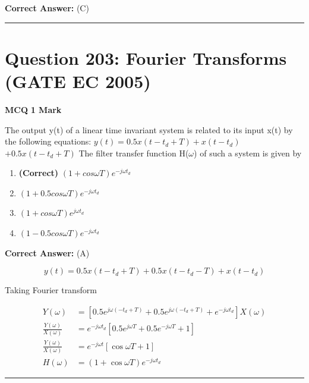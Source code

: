 \documentclass[11pt,a4paper]{article}
\begin{document}
\noindent \textbf{Correct Answer:} (C)


\vspace{1.5em}
\hrule
\vspace{1.5em}

\section*{Question 203: Fourier Transforms (GATE EC 2005)}
\noindent \textbf{\color{primary}MCQ} \hfill \textbf{\color{secondary}1 Mark}


\noindent The output y(t) of a linear time invariant system is related to its input x(t) by
the following equations:
 $y(t)=0.5x(t-t_{d}+T)+x(t-t_{d})$ $+0.5x(t-t_{d}+T)$
The filter transfer function H($\omega$) of such a system is given by


\begin{enumerate}[label=(\Alph*)]
    \item \textbf{(Correct)} $(1+cos\omega T)e^{-j\omega t_{d}}$
    \item $(1+0.5cos\omega T)e^{-j\omega t_{d}}$
    \item $(1+cos\omega T)e^{j\omega t_{d}}$
    \item $(1-0.5cos\omega T)e^{-j\omega t_{d}}$
\end{enumerate}

\noindent \textbf{Correct Answer:} (A)

\begin{tcolorbox}[solbox, title=Detailed Solution -- Question 203]
\[
y(t)=0.5 x\left(t-t_{d}+T\right)+0.5 x\left(t-t_{d}-T\right)+x\left(t-t_{d}\right)
\]

 Taking Fourier transform 

\[
\begin{aligned} Y(\omega)&=\left[0.5 e^{j \omega\left(-t_{d}+T\right)}+0.5 e^{j \omega\left(-t_{d}+T \right)}+e^{-j \omega t_{d}}\right] X(\omega) \\ \frac{Y(\omega)}{X(\omega)}&=e^{-j \omega t_{d}}\left[0.5 e^{j \omega T}+0.5 e^{-j\omega T}+1\right] \\ \frac{Y(\omega)}{X(\omega)}&=e^{-j \omega t} [\cos \omega T+1] \\ H(\omega)&=(1+\cos \omega T) e^{-j \omega t_d} \end{aligned}
\]
\end{tcolorbox}

\vspace{1.5em}
\hrule
\vspace{1.5em}
\end{document}
